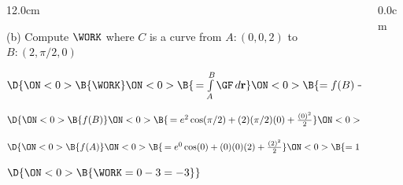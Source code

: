 %
\begin{frame}
\begin{columns}\begin{column}{12.0cm}

\vspace{0.1cm}

\scriptsize

(b) Compute $\WORK$ \quad where $C$ is a curve from $A:(0,0,2)$ to $B:\left(2,\pi/2,0\right)$

\vspace{0.2cm}


\begin{center}
	$\D{
	\ON<0>{\B{\WORK }}
	\ON<0>{\B{\, = \int \limits_{A}^{B} \GF \, d{\bf r}}}
	\ON<0>{\B{ = f(B) - f(A)}}
	}$
\end{center}


\vspace{0.3cm}

\quad $\D{
\ON<0>{\B{f(B) }}
\ON<0>{\B{\, = e^{2}\cos(\pi/2) + (2)(\pi/2)(0) + \frac{(0)^2}{2}}}
\ON<0>{\B{ = 0}}}$

\quad $\D{
\ON<0>{\B{f(A) }}
\ON<0>{\B{\, = e^{0}\cos(0) + (0)(0)(2) + \frac{(2)^2}{2}}}
\ON<0>{\B{= 1+2=3}}}$

\vspace{0.3cm}


\vspace{0.3cm}

\quad $\D{
\ON<0>{\B{\WORK = 0 - 3 = -3}}}$

\vspace{7.5cm}
	
\end{column}\begin{column}{0.0cm}\end{column}\end{columns}
\end{frame}
%
